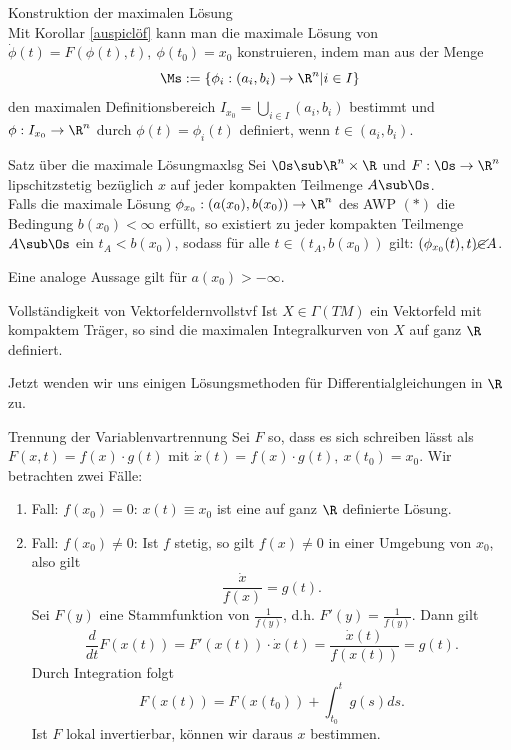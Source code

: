 \begin{bemerkung}Konstruktion der maximalen Lösung\\
Mit Korollar \ref{auspiclöf} kann man die maximale Lösung von $\dot{\phi}(t)=F(\phi(t), t), \ \phi(t_0)=x_0$ konstruieren, indem man aus der Menge
\begin{equation}
\Ms := \{\phi_i: (a_i, b_i) \to \R^n | i \in I \}
\end{equation}
den maximalen Definitionsbereich $I_{x_0}= \bigcup_{i \in I} (a_i, b_i)$ bestimmt und $\phi: I_{x_0} \to \R^n$ durch $\phi(t) = \phi_i(t)$ definiert, wenn $t \in (a_i, b_i)$.
\end{bemerkung}
\begin{satz}{Satz über die maximale Lösung}{maxlsg}
Sei $\Os \sub \R^n \times \R$ und $F: \Os \to \R^n$ lipschitzstetig bezüglich $x$ auf jeder kompakten Teilmenge $A \sub \Os$.\\
Falls die maximale Lösung $\phi_{x_0}:(a(x_0), b(x_0)) \to \R^n$ des AWP $(\ast)$ die Bedingung $b(x_0) < \infty$ erfüllt, so existiert zu jeder kompakten Teilmenge $A \sub \Os$ ein $t_A < b(x_0)$, sodass für alle $t \in (t_A, b(x_0))$ gilt: $(\phi_{x_0}(t), t) \cancel{\in} A$.
\end{satz}
\begin{bemerkung}
Eine analoge Aussage gilt für $a(x_0) > - \infty$.
\end{bemerkung}
\begin{korollar}{Vollständigkeit von Vektorfeldern}{vollstvf}
Ist $X \in \Gamma (TM)$ ein Vektorfeld mit kompaktem Träger, so sind die maximalen Integralkurven von $X$ auf ganz $\R$ definiert.
\end{korollar}
Jetzt wenden wir uns einigen Lösungsmethoden für Differentialgleichungen in $\R$ zu.
\begin{satz}{Trennung der Variablen}{vartrennung}
Sei $F$ so, dass es sich schreiben lässt als $F(x,t) = f(x) \cdot g(t)$ mit $\dot{x}(t) = f(x) \cdot g(t), \ x(t_0) = x_0$. Wir betrachten zwei Fälle:
\begin{enumerate}
\item Fall: $f(x_0)=0$: $x(t)\equiv x_0$ ist eine auf ganz $\R$ definierte Lösung.
\item Fall: $f(x_0)\neq 0$: Ist $f$ stetig, so gilt $f(x) \neq 0$ in einer Umgebung von $x_0$, also gilt
\begin{equation}
\frac{\dot{x}}{f(x)} = g(t).
\end{equation}
Sei $F(y)$ eine Stammfunktion von $\frac{1}{f(y)}$, d.h. $F'(y) = \frac{1}{f(y)}$. Dann gilt 
\begin{equation}
\frac{d}{dt}F(x(t)) = F'(x(t)) \cdot \dot{x}(t) = \frac{\dot{x}(t)}{f(x(t))}= g(t).
\end{equation}
Durch Integration folgt
\begin{equation}
F(x(t)) = F(x(t_0)) + \int_{t_0}^t g(s) ds.
\end{equation}
Ist $F$ lokal invertierbar, können wir daraus $x$ bestimmen.
\end{enumerate}
\end{satz}
